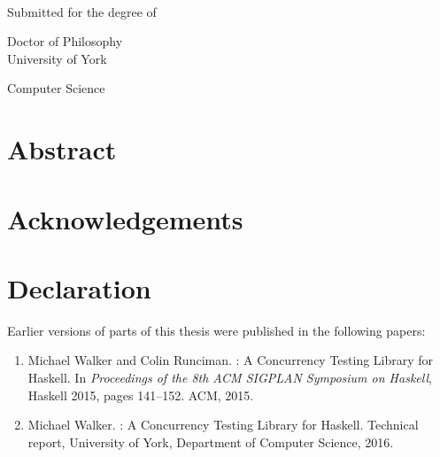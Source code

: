 \begin{titlepage}
  \begin{center}
    \makeatletter
    {\LARGE \@title}\\[1.5cm]
    {\large \@author}

    \vfill

    Submitted for the degree of\par
    Doctor of Philosophy\\[1.3cm]

    University of York\par
    Computer Science\\[1.3cm]

    \@date
    \makeatother
  \end{center}
\end{titlepage}

\chapter*{Abstract}
\blindtext

\makeatletter\renewcommand{}\makeatother
\tableofcontents
\listoffigures
\listoflistings
\listoftables

\chapter*{Acknowledgements}
\blindtext

\chapter*{Declaration}

Earlier versions of parts of this thesis were published in the following papers:

\begin{enumerate}
\item Michael Walker and Colin Runciman. \dejafu{}: A Concurrency Testing
  Library for Haskell.  In \emph{Proceedings of the 8th ACM SIGPLAN Symposium on
    Haskell}, Haskell 2015, pages 141--152.  ACM, 2015.\nocite{walker2015}
\item Michael Walker. \dejafu{}: A Concurrency Testing Library for Haskell.
  Technical report, University of York, Department of Computer Science,
  2016.\nocite{YCS-2016-503}
\end{enumerate}

